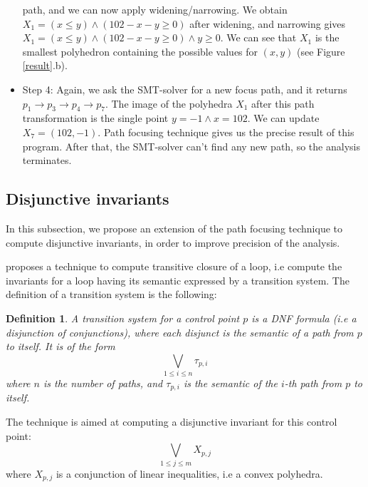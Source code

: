 \documentclass[a4paper,english,titlepage,11pt]{report}
\newtheorem{definition}{Definition}[section]
\begin{document}
\begin{itemize}
path, and we can now apply widening/narrowing. We obtain
$X_1 = (x \leq y) \wedge (102 - x - y \geq 0)$ after widening, and narrowing
gives $X_1 = (x \leq y) \wedge (102 - x - y \geq 0) \wedge y \geq 0$.
We can see that $X_1$ is the smallest polyhedron containing the possible values
for $(x,y)$ (see Figure \ref{result}.b).
\item Step 4: Again, we ask the SMT-solver for a new focus path, and it returns
$p_1 \rightarrow p_3 \rightarrow p_4 \rightarrow p_7$. The image of the
polyhedra $X_1$ after this path transformation is the single point $y=-1 \wedge
x = 102$. We can update $X_7 = {(102,-1)}$. Path focusing technique gives us the
precise result of this program. After that, the SMT-solver can't find any new
path, so the analysis terminates.
\end{itemize}



	\subsection{Disjunctive invariants}

	In this subsection, we propose an extension of the path focusing technique
	to compute disjunctive invariants, in order to improve precision of the
	analysis.

	\cite{GulwaniZ10} proposes a technique to compute transitive closure of a
	loop, i.e compute the invariants for a loop having its semantic
	expressed by a transition system. The definition of a transition system is
	the following:

	\begin{definition}
	A transition system for a control point $p$ is a DNF formula (i.e a
	disjunction of conjunctions), where each
	disjunct is the semantic of a path from $p$ to itself. It is of the form
	$$\bigvee_{1 \leq i \leq n} \tau_{p,i}$$ where $n$ is the number of
	paths, and $\tau_{p,i}$ is the semantic of the $i$-th path from $p$ to
	itself.
	\end{definition}

	The technique is aimed at computing a disjunctive invariant for this control
	point: 
	$$\displaystyle\bigvee_{1 \leq j \leq m} X_{p,j}$$
	where $X_{p,j}$ is a conjunction of linear inequalities, i.e a convex
	polyhedra.
\end{document}
